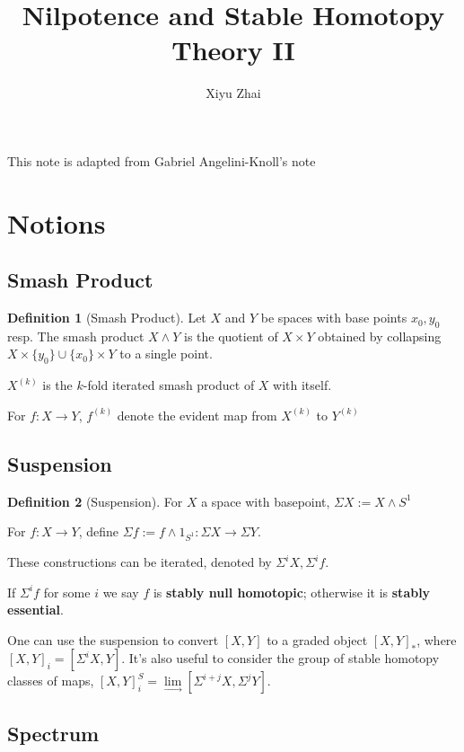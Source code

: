 \documentclass[11pt, oneside]{article}   	%
\title{Nilpotence and Stable Homotopy Theory II}
\author{Xiyu Zhai}
\date{}							%
\theoremstyle{definition}
\newtheorem*{defn}{Definition}
\begin{document}
\maketitle
\tableofcontents

This note is adapted from Gabriel Angelini-Knoll's note

\section{Notions}

\subsection{Smash Product}



\begin{defn}[Smash Product]
Let $X$ and $Y$ be spaces with base points $x_0,y_0$ resp. The smash product $X\wedge Y$ is the quotient of $X\times Y$ obtained by collapsing $X\times \{y_0\}\cup \{x_0\}\times Y$ to a single point.

$X^{(k)}$ is the $k$-fold iterated smash product of $X$ with itself.

For $f:X\to Y$, $f^{(k)}$ denote the evident map from $X^{(k)}$ to $Y^{(k)}$
	
\end{defn}

\subsection{Suspension}

\begin{defn}[Suspension]
	For $X$ a space with basepoint, $\Sigma X:=X\wedge S^1$

	For $f: X\to Y$, define $\Sigma f:= f\wedge 1_{S^1}: \Sigma X\to \Sigma Y$.

	These constructions can be iterated, denoted by $\Sigma^i X, \Sigma^i f$.

	If $\Sigma^i f$ for some $i$ we say $f$ is \textbf{stably null homotopic}; otherwise it is \textbf{stably essential}.

	One can use the suspension to convert $[X,Y]$ to a graded object $[X,Y]_*$, where $[X,Y]_i=[\Sigma^i X,Y]$. It's also useful to consider the group of stable homotopy classes of maps, $[X,Y]^S_i = \lim\limits_{\rightarrow}[\Sigma^{i+j}X,\Sigma^jY]$.
\end{defn}

\subsection{Spectrum}
\end{document}
